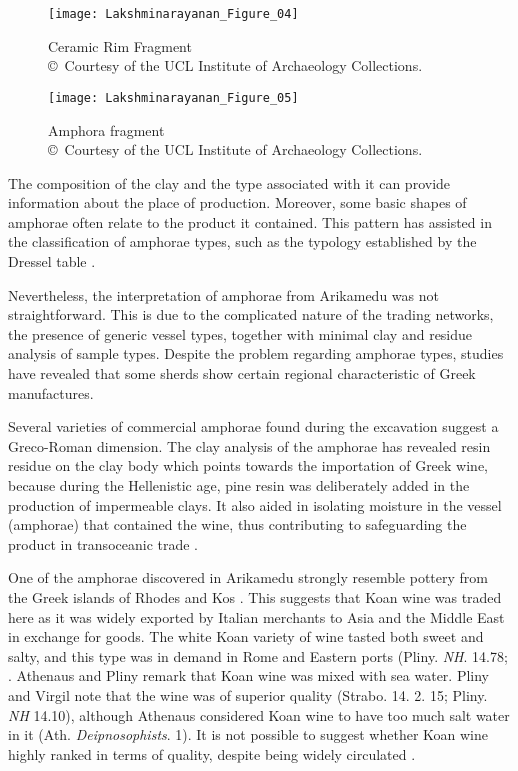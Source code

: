 \begin{figure}[!tb]
\begin{minipage}[b]{.49\linewidth}
	\texttt{[image: Lakshminarayanan\_Figure\_04]}
	\caption{Ceramic Rim Fragment\\
		{\normalfont\scriptsize\copyright\ Courtesy of the UCL Institute of Archaeology Collections.
	}}
	\label{fig:Lakshminarayanan_Figure_04}
\end{minipage}
\hfill
\begin{minipage}[b]{.49\linewidth}
	\texttt{[image: Lakshminarayanan\_Figure\_05]}
	\caption{Amphora fragment\\
		{\normalfont\scriptsize\copyright\ Courtesy of the UCL Institute of Archaeology Collections.
	}}
	\label{fig:Lakshminarayanan_Figure_05}
\end{minipage}
\end{figure}

The composition of the clay and the type associated with it can provide information about the place of production. Moreover, some basic shapes of amphorae often relate to the product it contained. This pattern has assisted in the classification of amphorae types, such as the typology established by the Dressel table \parencite[][Pl III]{dressel1899}.

Nevertheless, the interpretation of amphorae from Arikamedu was not straightforward. This is due to the complicated nature of the trading networks, the presence of generic vessel types, together with minimal clay and residue analysis of sample types. Despite the problem regarding amphorae types, studies have revealed that some sherds show certain regional characteristic of Greek manufactures.

Several varieties of commercial amphorae found during the excavation suggest a Greco-Roman dimension. The clay analysis of the amphorae has revealed resin residue on the clay body which points towards the importation of Greek wine, because during the Hellenistic age, pine resin was deliberately added in the production of impermeable clays. It also aided in isolating moisture in the vessel (amphorae) that contained the wine, thus contributing to safeguarding the product in transoceanic trade \parencite[][222]{zlateva2015}.

One of the amphorae discovered in Arikamedu strongly resemble pottery from the Greek islands of Rhodes and Kos \parencite[][114]{begley2004}. This suggests that Koan wine was traded here as it was widely exported by Italian merchants to Asia and the Middle East in exchange for goods. The white Koan variety of wine tasted both sweet and salty, and this type was in demand in Rome and Eastern ports (Pliny. \emph{NH}. 14.78; \cite[][236-241]{sherwin-white1978}.%
Athenaus and Pliny remark that Koan wine was mixed with sea water. Pliny and Virgil note that the wine was of superior quality (Strabo. 14. 2. 15; Pliny. \emph{NH} 14.10), although Athenaus considered Koan wine to have too much salt water in it (Ath. \emph{Deipnosophists}. 1). It is not possible to suggest whether Koan wine highly ranked in terms of quality, despite being widely circulated \parencite[][16]{craik2015}.

